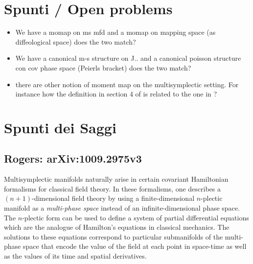 \documentclass[a4paper,12pt,fleqn]{article}  %
\begin{document}
\section{Spunti / Open problems}
\begin{itemize}
	\item We have a momap on ms mfd and a momap on mapping space (as diffeological space) does the two match?
	\item We have a canonical m-s structure on J.. and a canonical poisson structure con cov phase space (Peierls bracket) does the two match?
	\item there are other notion of moment map on the multisymplectic setting. For instance how the definition in section 4 of \cite{Gotay1998a} is related to the one in \cite{Ryvkin2018}?
\end{itemize}
	
	

\section{Spunti dei Saggi}
\subsection{Rogers: arXiv:1009.2975v3}
Multisymplectic manifolds naturally arise in certain covariant Hamiltonian formalisms for classical field theory.
In these formalisms, one describes a $(n+1)$-dimensional field theory by using a finite-dimensional $n$-plectic manifold as a \emph{multi-phase space} instead of an infinite-dimensional phase space. 
The $n$-plectic form can be used to define a system of partial differential equations which are the analogue of Hamilton's equations in classical mechanics. 
The solutions to these
equations correspond to particular submanifolds of the multi-phase space that encode the value of the field at each point in space-time as well as the values of its time and spatial derivatives.
\end{document}
